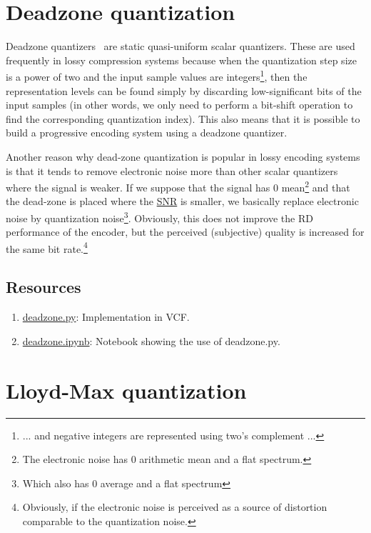 \section{Deadzone quantization}

Deadzone quantizers~\cite{vruiz__scalar_quantization} are static
quasi-uniform scalar quantizers. These are used frequently in lossy
compression systems because when the quantization step size is a power
of two and the input sample values are integers\footnote{... and negative
integers are represented using two's complement ...}, then the
representation levels can be found simply by discarding
low-significant bits of the input samples (in other words, we only
need to perform a bit-shift operation to find the corresponding
quantization index). This also means that it is possible to build a
progressive encoding system using a deadzone quantizer.

Another reason why dead-zone quantization is popular in lossy encoding
systems is that it tends to remove electronic noise more than other
scalar quantizers where the signal is weaker. If we suppose that the
signal has 0 mean\footnote{The electronic noise has 0 arithmetic mean
  and a flat spectrum.} and that the dead-zone is placed where the
\href{https://en.wikipedia.org/wiki/Signal-to-noise_ratio}{SNR} is
smaller, we basically replace electronic noise by quantization
noise\footnote{Which also has 0 average and a flat
  spectrum}. Obviously, this does not improve the RD performance of
the encoder, but the perceived (subjective) quality is increased for
the same bit rate.\footnote{Obviously, if the electronic noise is
  perceived as a source of distortion comparable to the quantization
  noise.}

\subsection*{Resources}
\begin{enumerate}
\item
  \href{https://github.com/Sistemas-Multimedia/VCF/blob/main/src/deadzone.py}{deadzone.py}: Implementation in VCF.
\item \href{https://github.com/Sistemas-Multimedia/VCF/blob/main/notebooks/deadzone.ipynb}{deadzone.ipynb}: Notebook showing the use of deadzone.py.
\end{enumerate}

\section{Lloyd-Max quantization}

